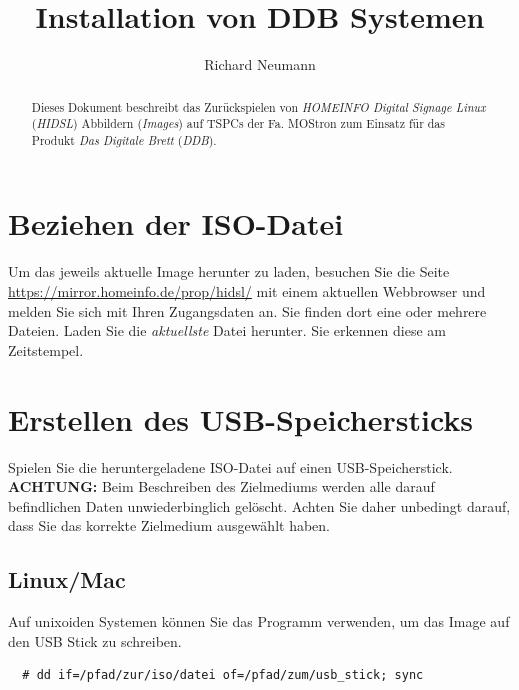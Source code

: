 \documentclass[a4paper,11pt,authoryear]{article}
\title{Installation von DDB Systemen}
\author[1]{Richard Neumann}
\affil[1]{HOMEINFO - Digitale Informationssysteme GmbH}
\begin{document}
\maketitle
\tableofcontents

\begin{abstract}
Dieses Dokument beschreibt das Zurückspielen von \emph{HOMEINFO Digital Signage Linux} (\emph{HIDSL}) Abbildern (\emph{Images}) auf TSPCs der Fa. MOStron zum Einsatz für das Produkt \emph{Das Digitale Brett} (\emph{DDB}).
\end{abstract}

\pagebreak

\section{Beziehen der ISO-Datei}
Um das jeweils aktuelle Image herunter zu laden, besuchen Sie die Seite \url{https://mirror.homeinfo.de/prop/hidsl/} mit einem aktuellen Webbrowser und melden Sie sich mit Ihren Zugangsdaten an.
Sie finden dort eine oder mehrere  Dateien. Laden Sie die \emph{aktuellste}  Datei herunter. Sie erkennen diese am Zeitstempel.

\section{Erstellen des USB-Speichersticks}
Spielen Sie die heruntergeladene ISO-Datei auf einen USB-Speicherstick.
\textbf{ACHTUNG:} Beim Beschreiben des Zielmediums werden alle darauf befindlichen Daten unwiederbinglich gelöscht. Achten Sie daher unbedingt darauf, dass Sie das korrekte Zielmedium ausgewählt haben.
\subsection{Linux/Mac}
Auf unixoiden Systemen können Sie das Programm  verwenden, um das Image auf den USB Stick zu schreiben.
\begin{verbatim}
  # dd if=/pfad/zur/iso/datei of=/pfad/zum/usb_stick; sync
\end{verbatim}
\end{document}
